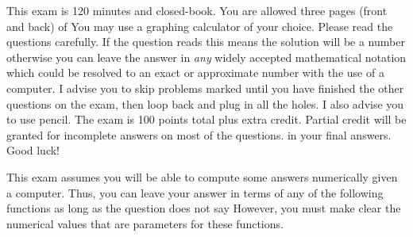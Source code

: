 \documentclass[12pt]{article}
\begin{document}
This exam is 120 minutes and closed-book. You are allowed three pages (front and back) of  You may use a graphing calculator of your choice. Please read the questions carefully. If the question reads  this means the solution will be a number otherwise you can leave the answer in \textit{any} widely accepted mathematical notation which could be resolved to an exact or approximate number with the use of a computer. I advise you to skip problems marked  until you have finished the other questions on the exam, then loop back and plug in all the holes. I also advise you to use pencil. The exam is 100 points total plus extra credit. Partial credit will be granted for incomplete answers on most of the questions.  in your final answers. Good luck!

\pagebreak

This exam assumes you will be able to compute some answers numerically given a computer. Thus, you can leave your answer in terms of any of the following functions as long as the question does not say  However, you must make clear the numerical values that are parameters for these functions.
\end{document}
